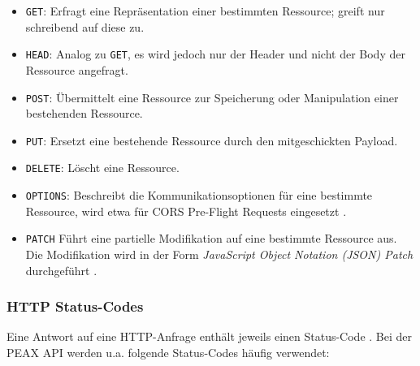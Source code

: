 \begin{itemize}
	\item \texttt{GET}: Erfragt eine Repräsentation einer bestimmten Ressource; greift nur schreibend auf diese zu.
    \item \texttt{HEAD}: Analog zu \texttt{GET}, es wird jedoch nur der Header und nicht der Body der Ressource angefragt.
	\item \texttt{POST}: Übermittelt eine Ressource zur Speicherung oder Manipulation einer bestehenden Ressource.
	\item \texttt{PUT}: Ersetzt eine bestehende Ressource durch den mitgeschickten Payload.
	\item \texttt{DELETE}: Löscht eine Ressource.
    \item \texttt{OPTIONS}: Beschreibt die Kommunikationsoptionen für eine bestimmte Ressource, wird etwa für CORS Pre-Flight Requests eingesetzt \cite{mdn-cors}.
    \item \texttt{PATCH} Führt eine partielle Modifikation auf eine bestimmte Ressource aus. \cite{RFC5789} Die Modifikation wird in der Form \textit{JavaScript Object Notation (JSON) Patch} durchgeführt \cite{RFC6902}.
\end{itemize}

\subsubsection{HTTP Status-Codes}

Eine Antwort auf eine HTTP-Anfrage enthält jeweils einen Status-Code \cite[Abschnitt 6]{RFC7231}. Bei der PEAX API werden u.a. folgende Status-Codes häufig verwendet:

